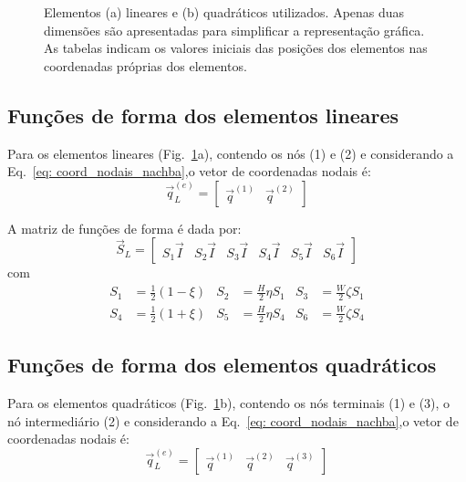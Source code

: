 \begin{figure}[ht]
    \centering
    
    \caption{Elementos (a) lineares e (b) quadráticos utilizados. Apenas duas dimensões são apresentadas para simplificar a representação gráfica. As tabelas indicam
    os valores iniciais das posições dos elementos nas coordenadas próprias dos elementos.}
    \label{fig: line_quad_elements}
\end{figure}

\subsection{Funções de forma dos elementos lineares}
Para os elementos lineares (Fig.~\ref{fig: line_quad_elements}a), contendo os nós (1) e (2) e considerando a Eq.~\eqref{eq: coord_nodais_nachba},o vetor de coordenadas nodais é:
\begin{equation}
    \vec{q}_L^{(e)} = \begin{bmatrix}
        \vec{q}^{(1)} & \vec{q}^{(2)}
    \end{bmatrix}
\end{equation}

A matriz de funções de forma é dada por:
\begin{equation}
    \vec{S}_{L} = \begin{bmatrix}
        S_1\vec{I} & S_2\vec{I} & S_3\vec{I} & S_4\vec{I} & S_5\vec{I} & S_6\vec{I}
    \end{bmatrix}    
\end{equation}
com
\begin{align}
    S_1 &= \frac{1}{2}(1-\xi) & S_2 &= \frac{H}{2}\eta S_1 & S_3 &= \frac{W}{2}\zeta S_1 \\
    S_4 &= \frac{1}{2}(1+\xi) & S_5 &= \frac{H}{2}\eta S_4 & S_6 &= \frac{W}{2}\zeta S_4
\end{align}

\subsection{Funções de forma dos elementos quadráticos}
Para os elementos quadráticos (Fig.~\ref{fig: line_quad_elements}b), contendo os nós terminais (1) e (3), o nó intermediário (2) e considerando a Eq.~\eqref{eq: coord_nodais_nachba},o vetor de coordenadas nodais é:
\begin{equation}
    \vec{q}_L^{(e)} = \begin{bmatrix}
        \vec{q}^{(1)} & \vec{q}^{(2)} &  \vec{q}^{(3)}
    \end{bmatrix}
\end{equation}

